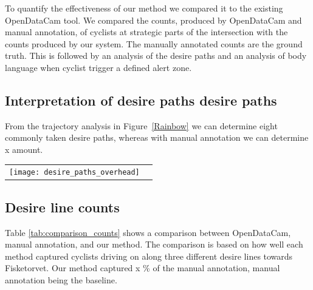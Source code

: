 To quantify the effectiveness of our method we compared it to the existing OpenDataCam tool.
We compared the counts, produced by OpenDataCam and manual annotation, of cyclists at strategic parts of the 
intersection with the counts produced by our system. The manually annotated counts are the ground truth.
This is followed by an analysis of the desire paths and an analysis of body language when cyclist trigger a defined
alert zone.
\ \\ 

\subsection{Interpretation of desire paths desire paths}
From the trajectory analysis in Figure~\ref{Rainbow} we can determine eight commonly taken desire paths,  
whereas with manual annotation we can determine x amount.
\ \\

\raggedbottom
\begin{tabular}{@{}cc}
\texttt{[image: desire\_paths\_overhead]} 
\end{tabular}
\label{traject}

\subsection{Desire line counts}
Table \ref{tab:comparison_counts} shows a comparison between OpenDataCam, manual annotation, and our method.
The comparison is based on how well each method captured cyclists driving on along three different 
desire lines towards Fisketorvet.
Our method captured x \% of the manual annotation, manual annotation being the baseline.
\ \\

\begin{table}[]
\caption{Comparison of counts}
\label{tab:comparison_counts}
\end{table}

